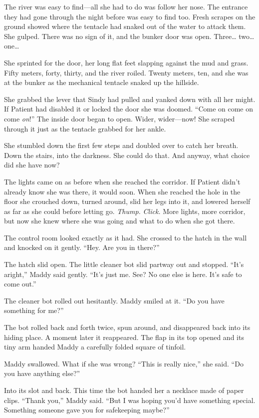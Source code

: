 \documentclass[10pt]{article}
\begin{document}
The river was easy to find---all she had to do was follow her nose. The
entrance they had gone through the night before was easy to find too.
Fresh scrapes on the ground showed where the tentacle had snaked out of
the water to attack them. She gulped. There was no sign of it, and the
bunker door was open. Three\ldots{} two\ldots{} one\ldots{}

She sprinted for the door, her long flat feet slapping against the mud
and grass. Fifty meters, forty, thirty, and the river roiled. Twenty
meters, ten, and she was at the bunker as the mechanical tentacle snaked
up the hillside.

She grabbed the lever that Sindy had pulled and yanked down with all her
might. If Patient had disabled it or locked the door she was doomed.
``Come on come on come \emph{on}!'' The inside door began to open.
Wider, wider---now! She scraped through it just as the tentacle grabbed
for her ankle.

She stumbled down the first few steps and doubled over to catch her
breath. Down the stairs, into the darkness. She could do that. And
anyway, what choice did she have now?

The lights came on as before when she reached the corridor. If Patient
didn't already know she was there, it would soon. When she reached the
hole in the floor she crouched down, turned around, slid her legs into
it, and lowered herself as far as she could before letting go.
\emph{Thump.} \emph{Click.} More lights, more corridor, but now she knew
where she was going and what to do when she got there.

The control room looked exactly as it had. She crossed to the hatch in
the wall and knocked on it gently. ``Hey. Are you in there?''

The hatch slid open. The little cleaner bot slid partway out and
stopped. ``It's aright,'' Maddy said gently. ``It's just me. See? No one
else is here. It's safe to come out.''

The cleaner bot rolled out hesitantly. Maddy smiled at it. ``Do you have
something for me?''

The bot rolled back and forth twice, spun around, and disappeared back
into its hiding place. A moment later it reappeared. The flap in its top
opened and its tiny arm handed Maddy a carefully folded square of
tinfoil.

Maddy swallowed. What if she was wrong? ``This is really nice,'' she
said. ``Do you have anything else?''

Into its slot and back. This time the bot handed her a necklace made of
paper clips. ``Thank you,'' Maddy said. ``But I was hoping you'd have
something special. Something someone gave you for safekeeping maybe?''
\end{document}
